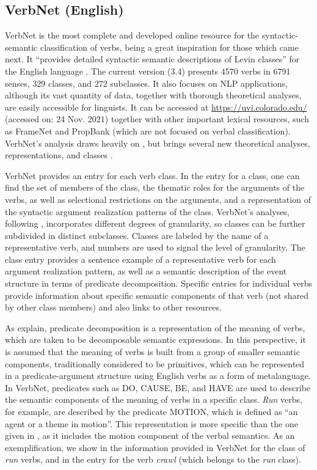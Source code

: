 \documentclass[english]{textolivre}
\begin{document}
\subsection{VerbNet (English)}

VerbNet \cite{schuler_verbnet:_2005,kipper_large-scale_2008} is the most complete and developed online resource for the syntactic-semantic classification of verbs, being a great inspiration for those which came next. It “provides detailed syntactic semantic descriptions of Levin classes” for the English language \cite[p.~21]{kipper_large-scale_2008}. The current version (3.4) presents 4570 verbs in 6791 senses, 329 classes, and 272 subclasses. It also focuses on NLP applications, although its vast quantity of data, together with thorough theoretical analyses, are easily accessible for linguists. It can be accessed at \url{https://uvi.colorado.edu/} (accessed on: 24 Nov. 2021) together with other important lexical resources, such as FrameNet and PropBank (which are not focused on verbal classification). VerbNet’s analysis draws heavily on \textcite{levin_english_1993}, but brings several new theoretical analyses, representations, and classes \cite{kipper_large-scale_2008}.

VerbNet provides an entry for each verb class. In the entry for a class, one can find the set of members of the class, the thematic roles for the arguments of the verbs, as well as selectional restrictions on the arguments, and a representation of the syntactic argument realization patterns of the class. VerbNet’s analyses, following \textcite{levin_english_1993}, incorporates different degrees of granularity, so classes can be further subdivided in distinct subclasses. Classes are labeled by the name of a representative verb, and numbers are used to signal the level of granularity. The class entry provides a sentence example of a representative verb for each argument realization pattern, as well as a semantic description of the event structure in terms of predicate decomposition. Specific entries for individual verbs provide information about specific semantic components of that verb (not shared by other class members) and also links to other resources.

As \textcite{levin_argument_2005} explain, predicate decomposition is a representation of the meaning of verbs, which are taken to be decomposable semantic expressions. In this perspective, it is assumed that the meaning of verbs is built from a group of smaller semantic components, traditionally considered to be primitives, which can be represented in a predicate-argument structure using English verbs as a form of metalanguage. In VerbNet, predicates such as DO, CAUSE, BE, and HAVE are used to describe the semantic components of the meaning of verbs in a specific class. \textit{Run} verbs, for example, are described by the predicate MOTION, which is defined as “an agent or a theme in motion”. This representation is more specific than the one given in , as it includes the motion component of the verbal semantics. As an exemplification, we show in  the information provided in VerbNet for the class of \textit{run} verbs, and in  the entry for the verb \textit{crawl} (which belongs to the \textit{run} class).
\end{document}
